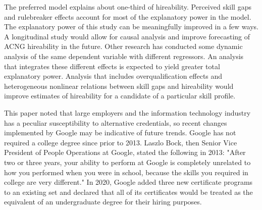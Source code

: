 \documentclass[review]{elsarticle}
\begin{document}

The preferred model explains about one-third of hireability.
Perceived skill gaps and rulebreaker effects account for most of the explanatory power in the model.
The explanatory power of this study can be meaningfully improved in a few ways.
A longitudinal study would allow for causal analysis and improve forecasting of ACNG hireability in the future.
Other research has conducted some dynamic analysis of the same dependent variable with different regressors\cite{vandivier2020preliminary}.
An analysis that integrates these different effects is expected to yield greater total explanatory power.
Analysis that includes overqualification effects and heterogeneous nonlinear relations between skill gaps and hireability would improve estimates of hireability for a candidate of a particular skill profile.

This paper noted that large employers and the information technology industry has a peculiar susceptibility to alternative credentials,
so recent changes implemented by Google may be indicative of future trends.
Google has not required a college degree since prior to 2013\cite{bryant2013head}.
Laszlo Bock, then Senior Vice President of People Operations at Google, stated the following in 2013:
"After two or three years, your ability to perform at Google is completely unrelated to how you performed when you were in school, because the skills you required in college are very different."
In 2020, Google added three new certificate programs to an existing set and declared that all of its certificates would be treated as the equivalent of an undergraduate degree for their hiring purposes\cite{hess_2020}.
\end{document}
